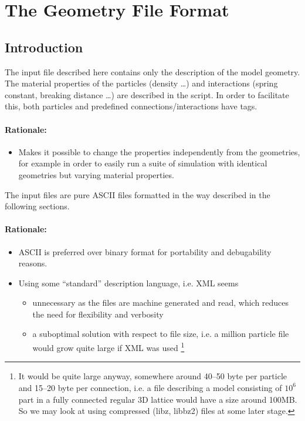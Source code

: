 \chapter{The Geometry File Format}
\label{cha:geofileformat}

\section{Introduction}
The input file described here contains only the description of the model geometry. The material properties of the particles (density \dots) and interactions (spring constant, breaking distance \dots) are described in the script. In order to facilitate this, both particles and predefined connections/interactions have tags.   
\subsubsection*{Rationale:}
\begin{itemize}
\item Makes it possible to change the properties
independently from the geometries, for example in order to easily run a suite of simulation with identical geometries but varying material properties.
\end{itemize}
The input files are pure ASCII files formatted in the way described in the following sections. 
\subsubsection*{Rationale:}
\begin{itemize}
\item ASCII is preferred over binary format for portability and debugability reasons.
\item Using some ``standard'' description language, i.e. XML seems 
  \begin{itemize}
  \item unnecessary as the files are machine generated and read, which reduces the need for flexibility and verbosity
  \item a suboptimal solution with respect to file size, i.e. a million particle file would grow quite large if XML was used \footnote{It would be quite large anyway, somewhere around 40--50 byte per particle and 15--20 byte per connection, i.e. a file describing a model consisting of $10^6$ part in a fully connected regular 3D lattice would have a size around 100MB. So we may look at using compressed (libz, libbz2) files at some later stage.} 
  \end{itemize}
\end{itemize}


